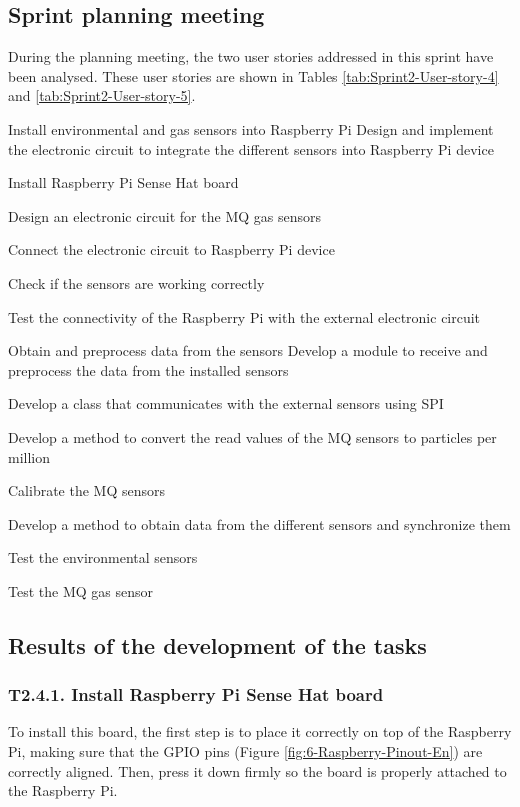 \subsection{Sprint planning meeting}
During the planning meeting, the two user stories addressed in this sprint have been analysed. These user stories are shown in Tables \ref{tab:Sprint2-User-story-4} and \ref{tab:Sprint2-User-story-5}.

{Install environmental and gas sensors into Raspberry Pi}
{Design and implement the electronic circuit to integrate the different sensors into Raspberry Pi device}
{	\item Install Raspberry Pi Sense Hat board
	\item Design an electronic circuit for the MQ gas sensors
	\item Connect the electronic circuit to Raspberry Pi device
}{	\item Check if the sensors are working correctly
	\item Test the connectivity of the Raspberry Pi with the external electronic circuit
}

{Obtain and preprocess data from the sensors}
{Develop a module to receive and preprocess the data from the installed sensors}
{	\item Develop a class that communicates with the external sensors using \ac{SPI}
	\item Develop a method to convert the read values of the MQ sensors to particles per million
	\item Calibrate the MQ sensors
	\item Develop a method to obtain data from the different sensors and synchronize them
}{	\item Test the environmental sensors
	\item Test the MQ gas sensor
}


\subsection{Results of the development of the tasks}

\subsubsection{T2.4.1. Install Raspberry Pi Sense Hat board}
To install this board, the first step is to place it correctly on top of the Raspberry Pi, making sure that the GPIO pins (Figure \ref{fig:6-Raspberry-Pinout-En}) are correctly aligned. Then, press it down firmly so the board is properly attached to the Raspberry Pi.

